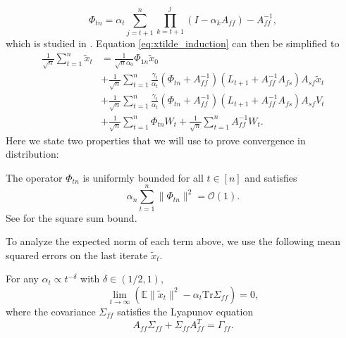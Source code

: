 \begin{equation}
    \Phi_{tn} = \alpha_t \sum_{j=t+1}^n \prod_{k=t+1}^{j} (I - \alpha_k A_{ff}) - A_{ff}^{-1} ,
\end{equation}
which is studied in \citep{polyakJuditsky,srikant2024CLT,kaledin2020finite}. 
Equation \eqref{eq:xtilde_induction} can then be simplified to 
\begin{align*}
    \frac{1}{\sqrt{n}} \sum_{t=1}^n \tilde{x}_t
    &= \frac{1}{\sqrt{n} \alpha_0} \Phi_{1n} \tilde{x}_0 
    \\ &+
    \frac{1}{\sqrt{n}} \sum_{t=1}^n \frac{\gamma_t}{\alpha_t} \left(\Phi_{tn} + A_{ff}^{-1}\right) (L_{t+1}+A_{ff}^{-1} A_{fs}) A_{sf} \tilde{x}_t
    \\
    &+ \frac{1}{\sqrt{n}} \sum_{t=1}^n \frac{\gamma_t}{\alpha_t} \left(\Phi_{tn} + A_{ff}^{-1}\right) (L_{t+1} + A_{ff}^{-1} A_{fs}) A_{sf} V_t 
    \\
    &+ \frac{1}{\sqrt{n}} \sum_{t=1}^n \Phi_{tn}W_t 
    + \frac{1}{\sqrt{n}} \sum_{t=1}^n A_{ff}^{-1} W_t.
\end{align*}
Here we state two properties that we will use to prove convergence in distribution:
\begin{lemma}\label{lem:Phi}
    The operator $\Phi_{tn}$ is uniformly bounded for all $t \in [n]$ and satisfies
    \begin{equation}
        \alpha_n \sum_{t=1}^n \lVert \Phi_{tn} \rVert^2 = \mathcal{O}(1) .
    \end{equation}
    See \citep{srikant2024CLT} for the square sum bound. 
\end{lemma}
To analyze the expected norm of each term above, we use the following mean squared errors on the last iterate $\tilde{x}_t$.
\begin{lemma}\label{lem:LastFast}
    For any $\alpha_t \propto t^{-\delta}$ with $\delta \in (1/2, 1)$, 
    \begin{equation}
        \lim_{t \to \infty} \left(\mathbb{E} \lVert \tilde{x}_t \rVert^2 - \alpha_t \mathrm{Tr} \Sigma_{ff}\right) = 0 ,
    \end{equation}
    where the covariance $\Sigma_{ff}$ satisfies the Lyapunov equation
    \begin{equation}
        A_{ff} \Sigma_{ff} + \Sigma_{ff} A_{ff}^T = \Gamma_{ff} .
    \end{equation}
\end{lemma}
